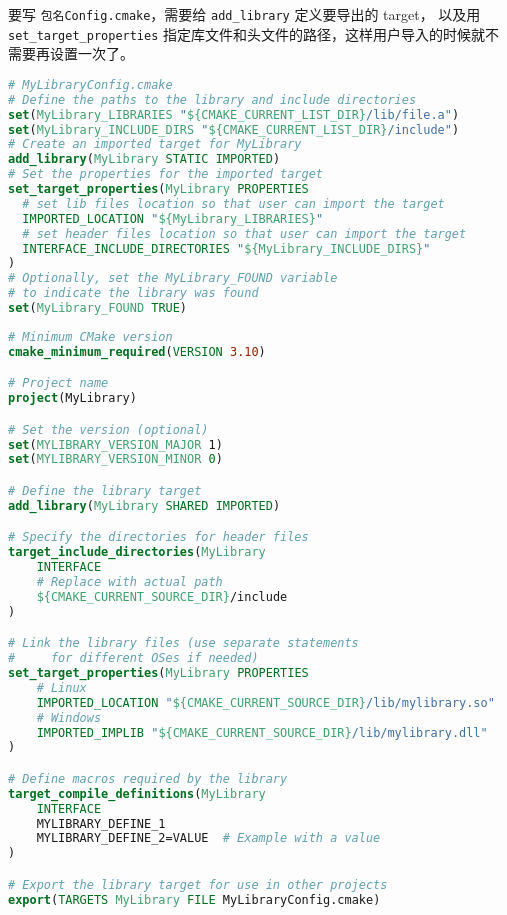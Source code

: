 要写 \verb`包名Config.cmake`，需要给 \verb`add_library` 定义要导出的 target， 以及用 \verb`set_target_properties` 指定库文件和头文件的路径，这样用户导入的时候就不需要再设置一次了。
\begin{lstlisting}[language=cmake]
# MyLibraryConfig.cmake
# Define the paths to the library and include directories
set(MyLibrary_LIBRARIES "${CMAKE_CURRENT_LIST_DIR}/lib/file.a")
set(MyLibrary_INCLUDE_DIRS "${CMAKE_CURRENT_LIST_DIR}/include")
# Create an imported target for MyLibrary
add_library(MyLibrary STATIC IMPORTED)
# Set the properties for the imported target
set_target_properties(MyLibrary PROPERTIES
  # set lib files location so that user can import the target
  IMPORTED_LOCATION "${MyLibrary_LIBRARIES}"
  # set header files location so that user can import the target
  INTERFACE_INCLUDE_DIRECTORIES "${MyLibrary_INCLUDE_DIRS}"
)
# Optionally, set the MyLibrary_FOUND variable
# to indicate the library was found
set(MyLibrary_FOUND TRUE)
\end{lstlisting}

\begin{lstlisting}[language=cmake]
# Minimum CMake version
cmake_minimum_required(VERSION 3.10)

# Project name
project(MyLibrary)

# Set the version (optional)
set(MYLIBRARY_VERSION_MAJOR 1)
set(MYLIBRARY_VERSION_MINOR 0)

# Define the library target
add_library(MyLibrary SHARED IMPORTED)

# Specify the directories for header files
target_include_directories(MyLibrary
    INTERFACE
    # Replace with actual path
    ${CMAKE_CURRENT_SOURCE_DIR}/include
)

# Link the library files (use separate statements
#     for different OSes if needed)
set_target_properties(MyLibrary PROPERTIES
    # Linux
    IMPORTED_LOCATION "${CMAKE_CURRENT_SOURCE_DIR}/lib/mylibrary.so"
    # Windows
    IMPORTED_IMPLIB "${CMAKE_CURRENT_SOURCE_DIR}/lib/mylibrary.dll"
)

# Define macros required by the library
target_compile_definitions(MyLibrary
    INTERFACE
    MYLIBRARY_DEFINE_1
    MYLIBRARY_DEFINE_2=VALUE  # Example with a value
)

# Export the library target for use in other projects
export(TARGETS MyLibrary FILE MyLibraryConfig.cmake)
\end{lstlisting}

